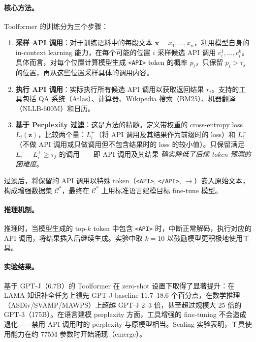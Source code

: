 \paragraph{核心方法。} Toolformer 的训练分为三个步骤：

\begin{enumerate}[leftmargin=*]
  \item \textbf{采样 API 调用}：对于训练语料中的每段文本 $\mathbf{x} = x_1, \ldots, x_n$，利用模型自身的 in-context learning 能力，在每个可能的位置 $i$ 采样候选 API 调用 $c_i^1, \ldots, c_i^k$。具体而言，对每个位置计算模型生成 \texttt{<API>} token 的概率 $p_i$，只保留 $p_i > \tau_s$ 的位置，再从这些位置采样具体的调用内容。

  \item \textbf{执行 API 调用}：实际执行所有候选 API 调用以获取返回结果 $r_i$。支持的工具包括 QA 系统（Atlas）、计算器、Wikipedia 搜索（BM25）、机器翻译（NLLB-600M）和日历。

  \item \textbf{基于 Perplexity 过滤}：这是方法的精髓。定义带权重的 cross-entropy loss $L_i(\mathbf{z})$，比较两个量：$L_i^+$（将 API 调用及其结果作为前缀时的 loss）和 $L_i^-$（不做 API 调用或只做调用但不包含结果时的 loss 的较小值）。只保留满足 $L_i^- - L_i^+ \geq \tau_f$ 的调用——即 API 调用及其结果 \emph{确实降低了后续 token 预测的困难度}。
\end{enumerate}

过滤后，将保留的 API 调用以特殊 token（\texttt{<API>}, \texttt{</API>}, \texttt{$\rightarrow$}）嵌入原始文本，构成增强数据集 $\mathcal{C}^*$，最终在 $\mathcal{C}^*$ 上用标准语言建模目标 fine-tune 模型。

\paragraph{推理机制。} 推理时，当模型生成的 top-$k$ token 中包含 \texttt{<API>} 时，中断正常解码，执行对应的 API 调用，将结果插入后继续生成。实验中取 $k=10$ 以鼓励模型更积极地使用工具。

\paragraph{实验结果。} 基于 GPT-J（6.7B）的 Toolformer 在 zero-shot 设置下取得了显著提升：在 LAMA 知识补全任务上领先 GPT-J baseline 11.7--18.6 个百分点，在数学推理（ASDiv/SVAMP/MAWPS）上超越 GPT-J 2--3 倍，甚至超过规模大 25 倍的 GPT-3（175B）。在语言建模 perplexity 方面，工具增强的 fine-tuning 不会造成退化——禁用 API 调用时的 perplexity 与原模型相当。Scaling 实验表明，工具使用能力在约 775M 参数时开始涌现（emerge）。

